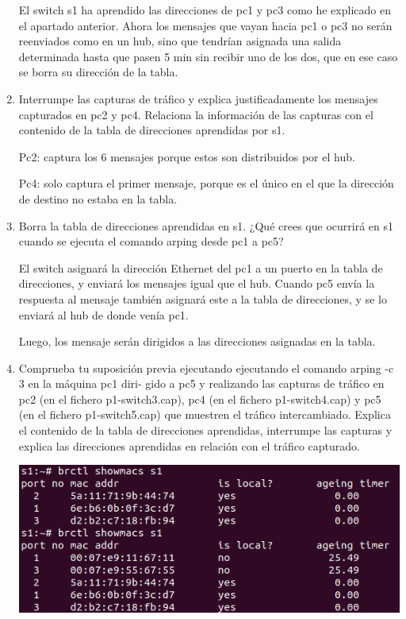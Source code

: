 \documentclass[12pt, a4paper]{report}
\begin{document}
\begin{enumerate}
	El switch s1 ha aprendido las direcciones de pc1 y pc3 como he explicado en el apartado anterior. Ahora los mensajes que vayan hacia pc1 o pc3 no serán reenviados como en un hub, sino que tendrían asignada una salida determinada hasta que pasen 5 min sin recibir uno de los dos, que en ese caso se borra su dirección de la tabla.
	\item Interrumpe las capturas de tráfico y explica justificadamente los mensajes capturados en pc2 y pc4. Relaciona
	la información de las capturas con el contenido de la tabla de direcciones aprendidas por s1.
	
	Pc2: captura los 6 mensajes porque estos son distribuidos por el hub.
	
	Pc4: solo captura el primer mensaje, porque es el único en el que la dirección de destino no estaba en la tabla.
	\item Borra la tabla de direcciones aprendidas en s1. ¿Qué crees que ocurrirá en s1 cuando se ejecuta el comando
	arping desde pc1 a pc5?
	
	El switch asignará la dirección Ethernet del pc1 a un puerto en la tabla de direcciones, y enviará los mensajes igual que el hub.
	Cuando pc5 envía la respuesta al mensaje también asignará este a la tabla de direcciones, y se lo enviará al hub de donde venía pc1.
	
	Luego, los mensaje serán dirigidos a las direcciones asignadas en la tabla.
	\item Comprueba tu suposición previa ejecutando ejecutando el comando arping -c 3 en la máquina pc1 diri-
	gido a pc5 y realizando las capturas de tráfico en pc2 (en el fichero p1-switch3.cap), pc4 (en el fichero
	p1-switch4.cap) y pc5 (en el fichero p1-switch5.cap) que muestren el tráfico intercambiado. Explica el
	contenido de la tabla de direcciones aprendidas, interrumpe las capturas y explica las direcciones aprendidas
	en relación con el tráfico capturado.
	
	\includegraphics*[width=128mm, scale=0.5, center]{screenshot2}
	

\end{enumerate}
\end{document}
